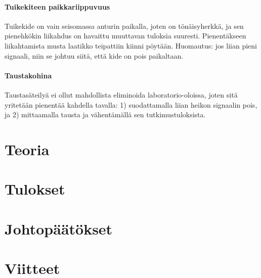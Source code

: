 \documentclass[a4paper, 12pt]{article}
\begin{document}
\paragraph{Tuikekiteen paikkariippuvuus\\}
Tuikekide on vain seisomassa anturin paikalla, joten on tönäisyherkkä, ja sen pienehkökin liikahdus on havaittu muuttavan tuloksia suuresti. Pienentäkseen liikahtamista musta laatikko teipattiin kiinni pöytään. Huomautus: jos liian pieni signaali, niin se johtuu siitä, että kide on pois paikaltaan.

\paragraph{Taustakohina\\}
Taustasäteilyä ei ollut mahdollista eliminoida laboratorio-oloissa, joten sitä yritetään pienentää kahdella tavalla: 1) suodattamalla liian heikon signaalin pois, ja 2) mittaamalla tausta ja vähentämällä sen tutkimustuloksista.

\section{Teoria}

\section{Tulokset}

\section{Johtopäätökset}

\section{Viitteet}
\end{document}
